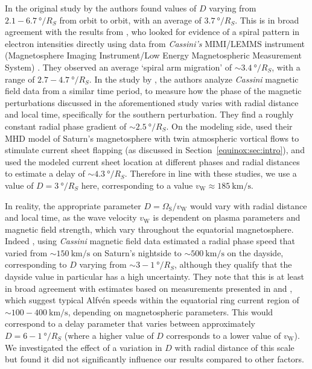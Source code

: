In the original study by \citet{arridge2011} the authors found values of $D$ varying from $2.1-\SI{6.7}{\degree/R_S}$ from orbit to orbit, with an average of $\SI{3.7}{\degree/R_S}$. This is in broad agreement with the results from \citet{carbary2007}, who looked for evidence of a spiral pattern in electron intensities directly using data from \textit{Cassini's} MIMI/LEMMS instrument (Magnetosphere Imaging Instrument/Low Energy Magnetospheric Measurement System) \citep{krimigis2004}. They observed an average `spiral arm migration' of ${{\sim}}\SI{3.4}{\degree/R_S}$, with a range of $2.7-\SI{4.7}{\degree/R_S}$. In the study by \citet{provan2012}, the authors analyze \textit{Cassini} magnetic field data from a similar time period, to measure how the phase of the magnetic perturbations discussed in the aforementioned \citet{andrews2012} study varies with radial distance and local time, specifically for the southern perturbation. They find a roughly constant radial phase gradient of ${{\sim}}\SI{2.5}{\degree/R_S}$. On the modeling side, \citet{jiaandkivelson2012} used their MHD model of Saturn's magnetosphere with twin atmospheric vortical flows to stimulate current sheet flapping (as discussed in Section~\ref{equinox:sec:intro}), and used the modeled current sheet location at different phases and radial distances to estimate a delay of ${\sim}\SI{4.3}{\degree/R_S}$. Therefore in line with these studies, we use a value of $D = \SI{3}{\degree/R_S}$ here, corresponding to a value $v_\mathrm{W} \approx \SI{185}{\km\per\second}$.

In reality, the appropriate parameter $D = \Omega_\mathrm{S}/v_\mathrm{W}$ would vary with radial distance and local time, as the wave velocity $v_\mathrm{W}$ is dependent on plasma parameters and magnetic field strength, which vary throughout the equatorial magnetosphere. Indeed \citet{andrews2010}, using \textit{Cassini} magnetic field data estimated a radial phase speed that varied from ${\sim}\SI{150}{\km\per\second}$ on Saturn's nightside to ${\sim}\SI{500}{\km\per\second}$ on the dayside, corresponding to $D$ varying from ${\sim}3-\SI{1}{\degree/R_S}$, although they qualify that the dayside value in particular has a high uncertainty. They note that this is at least in broad agreement with estimates based on measurements presented in \citet{wilson2008} and \citet{mcandrews2009}, which suggest typical Alfv\'{e}n speeds within the equatorial ring current region of ${\sim}100-\SI{400}{\km\per\second}$, depending on magnetospheric parameters. This would correspond to a delay parameter that varies between approximately $D = 6-\SI{1}{\degree/R_S}$ (where a higher value of $D$ corresponds to a lower value of $v_\mathrm{W}$). We investigated the effect of a variation in $D$ with radial distance of this scale but found it did not significantly influence our results compared to other factors. %

